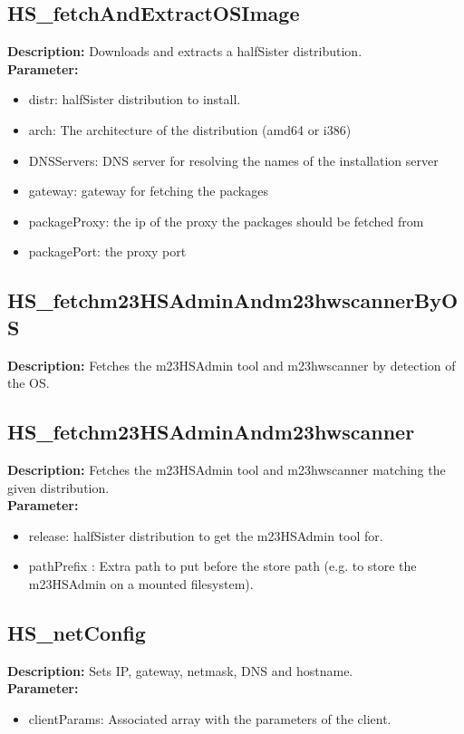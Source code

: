 \subsection{HS\_fetchAndExtractOSImage}
\textbf{Description:} Downloads and extracts a halfSister distribution.\\
\textbf{Parameter:}
\begin{itemize}
\item distr: halfSister distribution to install.
\item arch: The architecture of the distribution (amd64 or i386)
\item DNSServers: DNS server for resolving the names of the installation server
\item gateway: gateway for fetching the packages
\item packageProxy: the ip of the proxy the packages should be fetched from
\item packagePort: the proxy port
\end{itemize}

\subsection{HS\_fetchm23HSAdminAndm23hwscannerByOS}
\textbf{Description:} Fetches the m23HSAdmin tool and m23hwscanner by detection of the OS.\\

\subsection{HS\_fetchm23HSAdminAndm23hwscanner}
\textbf{Description:} Fetches the m23HSAdmin tool and m23hwscanner matching the given distribution.\\
\textbf{Parameter:}
\begin{itemize}
\item release: halfSister distribution to get the m23HSAdmin tool for.
\item pathPrefix : Extra path to put before the store path (e.g. to store the m23HSAdmin on a mounted filesystem).
\end{itemize}

\subsection{HS\_netConfig}
\textbf{Description:} Sets IP, gateway, netmask, DNS and hostname.\\
\textbf{Parameter:}
\begin{itemize}
\item clientParams: Associated array with the parameters of the client.
\end{itemize}

